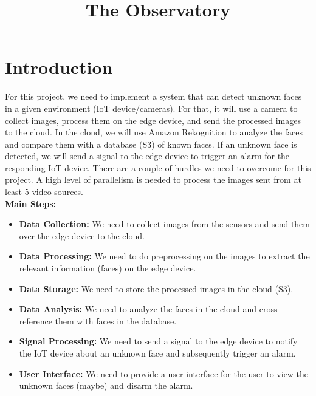\documentclass[conference]{IEEEtran}
\begin{document}
\title{The Observatory}

\author{
\and
{}
\and
{}
}

\maketitle

\section{Introduction}
For this project, we need to implement a system that can detect unknown faces in a given environment (IoT device/cameras). 
For that, it will use a camera to collect images, process them on the edge device, and send the processed images to the cloud. 
In the cloud, we will use Amazon Rekognition to analyze the faces and compare them with a database (S3) of known faces. 
If an unknown face is detected, we will send a signal to the edge device to trigger an alarm for the responding IoT device.
There are a couple of hurdles we need to overcome for this project. A high level of parallelism is needed to process the 
images sent from at least 5 video sources.
\\
\textbf{Main Steps:}
\begin{itemize}
    \item \textbf{Data Collection:} We need to collect images from the sensors and send them over the edge device to the cloud.
    \item \textbf{Data Processing:} We need to do preprocessing on the images to extract the relevant information (faces) on the edge device.
    \item \textbf{Data Storage:} We need to store the processed images in the cloud (S3).
    \item \textbf{Data Analysis:} We need to analyze the faces in the cloud and cross-reference them with faces in the database.
    \item \textbf{Signal Processing:} We need to send a signal to the edge device to notify the IoT device about an unknown face and subsequently trigger an alarm.
    \item \textbf{User Interface:} We need to provide a user interface for the user to view the unknown faces (maybe) and disarm the alarm.
\end{itemize}
\end{document}
